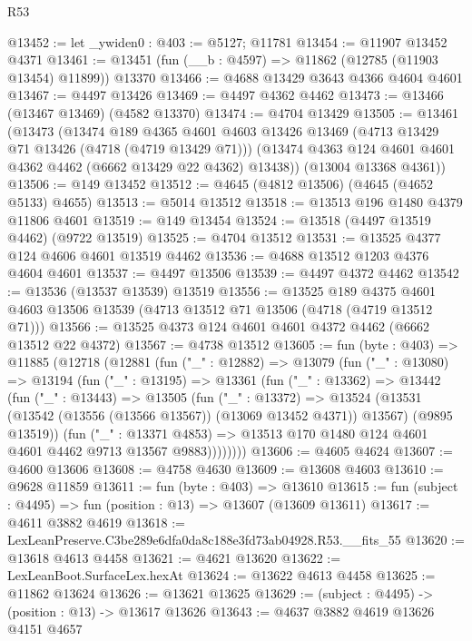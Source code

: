 \begin{lexlean}{R53}
\begin{coremodule}
@13452 := let _ywiden0 : @403 := @5127; @11781
@13454 := @11907 @13452 @4371
@13461 := @13451 (fun (__b : @4597) => @11862 (@12785 (@11903 @13454) @11899)) @13370
@13466 := @4688 @13429 @3643 @4366 @4604 @4601
@13467 := @4497 @13426
@13469 := @4497 @4362 @4462
@13473 := @13466 (@13467 @13469) (@4582 @13370)
@13474 := @4704 @13429
@13505 := @13461
    (@13473
      (@13474
        @189
        @4365
        @4601
        @4603
        @13426
        @13469
        (@4713 @13429 @71 @13426 (@4718 (@4719 @13429 @71)))
        (@13474 @4363 @124 @4601 @4601 @4362 @4462 (@6662 @13429 @22 @4362) @13438))
      (@13004 @13368 @4361))
@13506 := @149 @13452
@13512 := @4645 (@4812 @13506) (@4645 (@4652 @5133) @4655)
@13513 := @5014 @13512
@13518 := @13513 @196 @1480 @4379 @11806 @4601
@13519 := @149 @13454
@13524 := @13518 (@4497 @13519 @4462) (@9722 @13519)
@13525 := @4704 @13512
@13531 := @13525 @4377 @124 @4606 @4601 @13519 @4462
@13536 := @4688 @13512 @1203 @4376 @4604 @4601
@13537 := @4497 @13506
@13539 := @4497 @4372 @4462
@13542 := @13536 (@13537 @13539) @13519
@13556 := @13525
    @189
    @4375
    @4601
    @4603
    @13506
    @13539
    (@4713 @13512 @71 @13506 (@4718 (@4719 @13512 @71)))
@13566 := @13525 @4373 @124 @4601 @4601 @4372 @4462 (@6662 @13512 @22 @4372)
@13567 := @4738 @13512
@13605 := fun (byte : @403) =>
  @11885
    (@12718
      (@12881
        (fun ("_" : @12882) =>
        @13079
          (fun ("_" : @13080) =>
          @13194
            (fun ("_" : @13195) =>
            @13361
              (fun ("_" : @13362) =>
              @13442
                (fun ("_" : @13443) =>
                @13505
                  (fun ("_" : @13372) =>
                  @13524
                    (@13531 (@13542 (@13556 (@13566 @13567)) (@13069 @13452 @4371)) @13567)
                    (@9895 @13519))
                  (fun ("_" : @13371 @4853) =>
                  @13513 @170 @1480 @124 @4601 @4601 @4462 @9713 @13567 @9883))))))))
@13606 := @4605 @4624
@13607 := @4600 @13606
@13608 := @4758 @4630
@13609 := @13608 @4603
@13610 := @9628 @11859
@13611 := fun (byte : @403) => @13610
@13615 := fun (subject : @4495) => fun (position : @13) => @13607 (@13609 @13611)
@13617 := @4611 @3882 @4619
@13618 := LexLeanPreserve.C3be289e6dfa0da8c188e3fd73ab04928.R53.__fits_55
@13620 := @13618 @4613 @4458
@13621 := @4621 @13620
@13622 := LexLeanBoot.SurfaceLex.hexAt
@13624 := @13622 @4613 @4458
@13625 := @11862 @13624
@13626 := @13621 @13625
@13629 := (subject : @4495) -> (position : @13) -> @13617 @13626
@13643 := @4637
    @3882
    @4619
    @13626
    @4151
    @4657

\end{coremodule}
\end{lexlean}
